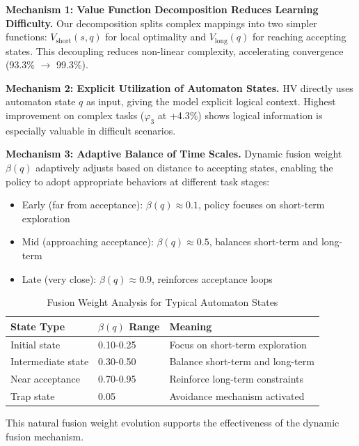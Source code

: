 \documentclass[conference]{IEEEtran}
\begin{document}
\textbf{Mechanism 1: Value Function Decomposition Reduces Learning Difficulty.} Our decomposition splits complex mappings into two simpler functions: $V_{\text{short}}(s,q)$ for local optimality and $V_{\text{long}}(q)$ for reaching accepting states. This decoupling reduces non-linear complexity, accelerating convergence (93.3\% $\rightarrow$ 99.3\%).

\textbf{Mechanism 2: Explicit Utilization of Automaton States.} HV directly uses automaton state $q$ as input, giving the model explicit logical context. Highest improvement on complex tasks ($\varphi_3$ at +4.3\%) shows logical information is especially valuable in difficult scenarios.

\textbf{Mechanism 3: Adaptive Balance of Time Scales.} Dynamic fusion weight $\beta(q)$ adaptively adjusts based on distance to accepting states, enabling the policy to adopt appropriate behaviors at different task stages:

\begin{itemize}
    \item Early (far from acceptance): $\beta(q) \approx 0.1$, policy focuses on short-term exploration
    \item Mid (approaching acceptance): $\beta(q) \approx 0.5$, balances short-term and long-term
    \item Late (very close): $\beta(q) \approx 0.9$, reinforces acceptance loops
\end{itemize}

\begin{table}[t]
\centering
\caption{Fusion Weight Analysis for Typical Automaton States}
\label{tab:fusion_weight_analysis}
\begin{tabular}{@{}lll@{}}
\toprule
\textbf{State Type} & \textbf{$\beta(q)$ Range} & \textbf{Meaning} \\ \midrule
Initial state & 0.10-0.25 & Focus on short-term exploration \\
Intermediate state & 0.30-0.50 & Balance short-term and long-term \\
Near acceptance & 0.70-0.95 & Reinforce long-term constraints \\
Trap state & 0.05 & Avoidance mechanism activated \\ \bottomrule
\end{tabular}
\end{table}

This natural fusion weight evolution supports the effectiveness of the dynamic fusion mechanism.
\end{document}
